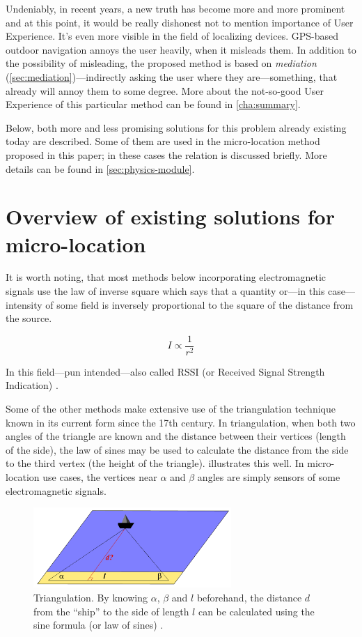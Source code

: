 Undeniably, in recent years, a new truth has become more and more prominent and at this point, it would be really dishonest not to mention importance of User Experience. It's even more visible in the field of localizing devices. GPS-based outdoor navigation annoys the user heavily, when it misleads them. In addition to the possibility of misleading, the proposed method is based on \emph{mediation} (\cref{sec:mediation})---indirectly asking the user where they are---something, that already will annoy them to some degree. More about the not-so-good User Experience of this particular method can be found in \cref{cha:summary}.

Below, both more and less promising solutions for this problem already existing today are described. Some of them are used in the micro-location method proposed in this paper; in these cases the relation is discussed briefly. More details can be found in \cref{sec:physics-module}.

\section{Overview of existing solutions for micro-location}
\label{sec:existing-uloc}

It is worth noting, that most methods below incorporating electromagnetic signals use the law of inverse square which says that a quantity or---in this case---intensity of some field is inversely proportional to the square of the distance from the source.

\begin{equation}
	\label{eq:inverse-sq}
	I \propto \frac{1}{r^2}
\end{equation}

In this field---pun intended---also called RSSI (or Received Signal Strength Indication) \cite{Gough:RSSI}.

Some of the other methods make extensive use of the triangulation technique known in its current form since the 17th century. In triangulation, when both two angles of the triangle are known and the distance between their vertices (length of the side), the law of sines may be used to calculate the distance from the side to the third vertex (the height of the triangle).  illustrates this well. In micro-location use cases, the vertices near $\alpha$ and $\beta$ angles are simply sensors of some electromagnetic signals.

\begin{figure}[h]
	\centering
	\includegraphics[width=0.67\textwidth]{triangulation}
	\caption{Triangulation. By knowing $\alpha$, $\beta$ and $l$ beforehand, the distance $d$ from the ``ship'' to the side of length $l$ can be calculated using the sine formula (or law of sines) \cite{wiki:triangulation}.}
	\label{fig:triangulation}
\end{figure}


